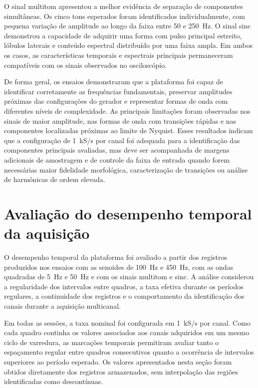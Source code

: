 \documentclass[a4paper,12pt]{fcte}
\begin{document}
O sinal multitom apresentou a melhor evidência de separação de componentes simultâneas. Os cinco tons esperados foram identificados individualmente, com pequena variação de amplitude ao longo da faixa entre 50 e 250~Hz. O sinal sinc demonstrou a capacidade de adquirir uma forma com pulso principal estreito, lóbulos laterais e conteúdo espectral distribuído por uma faixa ampla. Em ambos os casos, as características temporais e espectrais principais permaneceram compatíveis com os sinais observados no osciloscópio.

De forma geral, os ensaios demonstraram que a plataforma foi capaz de identificar corretamente as frequências fundamentais, preservar amplitudes próximas das configurações do gerador e representar formas de onda com diferentes níveis de complexidade. As principais limitações foram observadas nos sinais de maior amplitude, nas formas de onda com transições rápidas e nas componentes localizadas próximas ao limite de Nyquist. Esses resultados indicam que a configuração de 1~kS/s por canal foi adequada para a identificação das componentes principais avaliadas, mas deve ser acompanhada de margens adicionais de amostragem e de controle da faixa de entrada quando forem necessárias maior fidelidade morfológica, caracterização de transições ou análise de harmônicas de ordem elevada.

\section{Avaliação do desempenho temporal da aquisição}
\label{sec:desempenho_temporal}

O desempenho temporal da plataforma foi avaliado a partir dos registros produzidos nos ensaios com as senoides de 100~Hz e 450~Hz, com as ondas quadradas de 5~Hz e 50~Hz e com os sinais multitom e sinc. A análise considerou a regularidade dos intervalos entre quadros, a taxa efetiva durante os períodos regulares, a continuidade dos registros e o comportamento da identificação dos canais durante a aquisição multicanal.

Em todas as sessões, a taxa nominal foi configurada em 1~kS/s por canal. Como cada quadro continha os valores associados aos canais adquiridos em um mesmo ciclo de varredura, as marcações temporais permitiram avaliar tanto o espaçamento regular entre quadros consecutivos quanto a ocorrência de intervalos superiores ao período esperado. Os valores apresentados nesta seção foram obtidos diretamente dos registros armazenados, sem interpolação das regiões identificadas como descontínuas.
\end{document}
